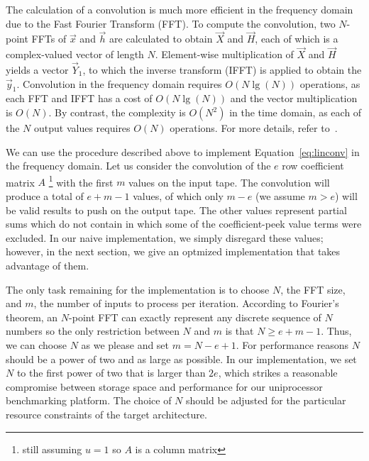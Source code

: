 The calculation of a convolution is much more efficient in the
frequency domain due to the Fast Fourier Transform (FFT).  To compute
the convolution, two $N$-point FFTs of $\vec{x}$ and $\vec{h}$ are
calculated to obtain $\vec{X}$ and $\vec{H}$, each of which is a
complex-valued vector of length $N$.  Element-wise multiplication of
$\vec{X}$ and $\vec{H}$ yields a vector $\vec{Y}_1$, to which the  
inverse transform (IFFT) is applied to obtain the $\vec{y}_1$.
Convolution in the frequency domain requires $O(N \lg(N))$ operations,
as each FFT and IFFT has a cost of $O(N \lg (N))$ and the vector
multiplication is $O(N)$.  By contrast, the complexity is $O(N^2)$ in
the time domain, as each of the $N$ output values requires $O(N)$
operations.  For more details, refer to~\cite{oppenheim-discrete}.

We can use the procedure described above to implement
Equation~\ref{eq:linconv} in the frequency domain.  Let us consider
the convolution of the $e$ row coefficient matrix $A$
\footnote{still assuming $u=1$ so $A$ is a column matrix} with the
first $m$ values on the input tape. The convolution will produce 
a total of $e+m-1$ values, of which only $m-e$ (we assume $m>e$) 
will be valid results to push on the output tape.
The other values represent partial sums which do not contain
in which some of the coefficient-peek value terms were excluded.
In our naive implementation, we simply disregard these values; 
however, in the next section, we give an optmized implementation 
that takes advantage of them.

The only task remaining for the implementation is to choose $N$, 
the FFT size, and $m$, the number of inputs to process per iteration.
According to Fourier's theorem, an $N$-point FFT can exactly represent 
any discrete sequence of $N$ numbers so the only restriction between $N$ and
$m$ is that $N\ge e+m-1$.
Thus, we can choose $N$ as we please and set $m = N-e+1$.  
For performance reasons $N$ should be a power of two and as large as possible.  
In our implementation, we set $N$ to the first power of two that is 
larger than $2e$, which strikes a reasonable compromise between storage 
space and performance for our uniprocessor benchmarking platform. 
The choice of $N$ should be adjusted for the particular resource 
constraints of the target architecture.

